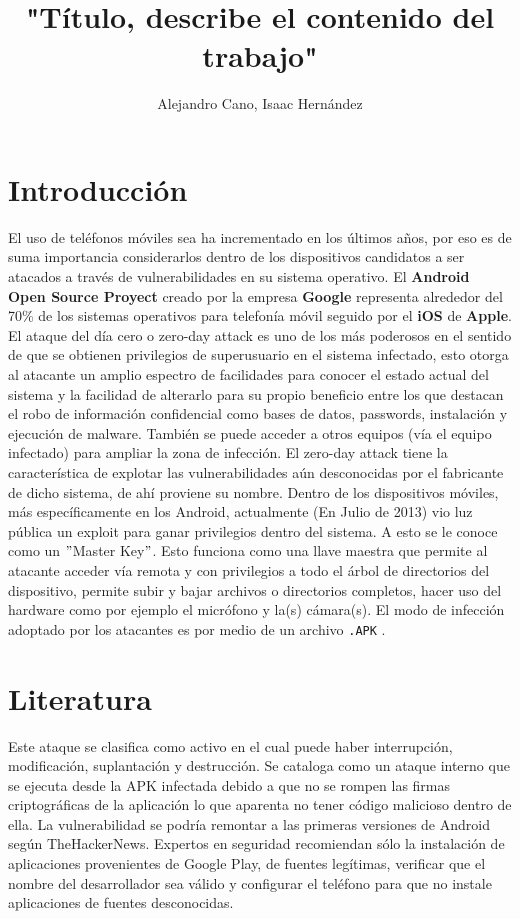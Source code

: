 \documentclass[12pt,twocolumn]{report}
\title{"Título, describe el contenido del trabajo"}
\author{Alejandro Cano,   Isaac Hernández}  %
\affil{Universidad Nacional Autónoma de México}
\date{ }%
\begin{document}
\ifpdf
{}
\else
{}
\fi

\maketitle


\begin{abstract}
\end{abstract}
\section{Introducción}

El uso de teléfonos móviles sea ha incrementado en los últimos años, por eso es de suma importancia 
considerarlos dentro de los dispositivos candidatos a ser atacados a través de vulnerabilidades en su sistema 
operativo. El \textbf{Android Open Source Proyect} creado por la empresa \textbf{Google} representa alrededor 
del 70\% de los sistemas operativos para telefonía móvil seguido por el \textbf{iOS} de \textbf{Apple}.
El ataque del día cero o zero-day attack es uno de los más poderosos en el sentido de que se obtienen 
privilegios de superusuario en el sistema infectado, esto otorga al atacante un amplio espectro de facilidades 
para conocer el estado actual del sistema y la facilidad de alterarlo para su propio beneficio entre los que destacan
el robo de información confidencial como bases de datos, passwords, instalación y ejecución de malware. También se 
puede acceder a otros equipos (vía el equipo infectado) para ampliar la zona de infección. El zero-day attack 
tiene la característica de explotar las vulnerabilidades aún desconocidas por el fabricante de dicho sistema, 
de ahí proviene su nombre. Dentro de los dispositivos móviles, más específicamente en los Android, actualmente 
(En Julio de 2013) vio luz pública un exploit para ganar privilegios dentro del sistema. A esto se le conoce como 
un $"$Master Key$"$. Esto funciona como una llave maestra que permite al atacante acceder vía remota y con privilegios 
a todo el árbol de directorios del dispositivo, permite subir y bajar archivos o directorios completos, hacer uso del 
hardware como por ejemplo el micrófono y la(s) cámara(s). El modo de infección adoptado por los atacantes es por medio 
de un archivo \texttt{.APK} .

\section{Literatura}
Este ataque se clasifica como activo en el cual puede haber interrupción, modificación, suplantación y destrucción. Se 
cataloga como un ataque interno que se ejecuta desde la APK infectada debido a que no se rompen las firmas criptográficas 
de la aplicación lo que aparenta no tener código malicioso dentro de ella. La vulnerabilidad se podría remontar a las primeras
versiones de Android según TheHackerNews. Expertos en seguridad recomiendan sólo la instalación de aplicaciones provenientes de 
Google Play, de fuentes legítimas, verificar que el nombre del desarrollador sea válido y configurar el teléfono para que no 
instale aplicaciones de fuentes desconocidas.
\end{document}
